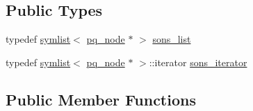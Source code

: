 \subsection*{Public Types}
\begin{DoxyCompactItemize}
\item 
typedef \mbox{\hyperlink{classsymlist}{symlist}}$<$ \mbox{\hyperlink{classpq__node}{pq\+\_\+node}} $\ast$ $>$ \mbox{\hyperlink{classpq__tree_a241e516724fdb5ca21239772164458f3}{sons\+\_\+list}}
\item 
typedef \mbox{\hyperlink{classsymlist}{symlist}}$<$ \mbox{\hyperlink{classpq__node}{pq\+\_\+node}} $\ast$ $>$\+::iterator \mbox{\hyperlink{classpq__tree_ab47263066d4b0acc70e00043870d748a}{sons\+\_\+iterator}}
\end{DoxyCompactItemize}
\subsection*{Public Member Functions}
